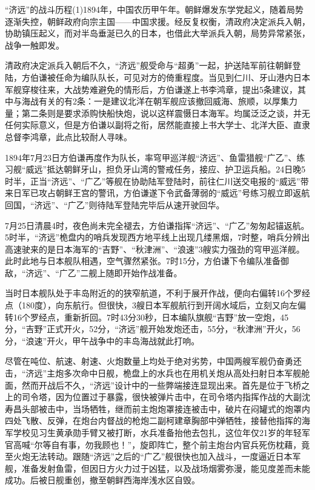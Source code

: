 \documentclass[12pt,UTF8]{ctexbook}
\begin{document}
“济远”的战斗历程(1)1894年，中国农历甲午年。朝鲜爆发东学党起义，随着局势逐渐失控，朝鲜政府向宗主国——中国求援。经反复权衡，清政府决定派兵入朝，协助镇压起义，而对半岛垂涎已久的日本，也借此大举派兵入朝，局势异常紧张，战争一触即发。

清政府决定派兵入朝后不久，“济远”舰受命与“超勇”一起，护送陆军前往朝鲜登陆，方伯谦被任命为编队队长，可见对方的倚重程度。当见到仁川、牙山港内日本军舰穿梭往来，大战势难避免的情形后，方伯谦遂上书李鸿章，提出5条建议，其中与海战有关的有2条：一是建议北洋在朝军舰应该撤回威海、旅顺，以厚集力量；第二条则是要求添购快船快炮，说以这样震慑日本海军。均属泛泛之谈，并无任何实际意义，但是方伯谦以副将之衔，居然能直接上书大学士、北洋大臣、直隶总督李鸿章，此点比较耐人寻味。

1894年7月23日方伯谦再度作为队长，率穹甲巡洋舰“济远”、鱼雷猎舰“广乙”、练习舰“威远”抵达朝鲜牙山，担负牙山湾的警戒任务，接应、护卫运兵船。24日晚5时半，正当“济远”、“广乙”等舰在协助陆军登陆时，前往仁川送交电报的“威远”带来日军已攻占朝鲜王宫的警讯，方伯谦遂下令武备薄弱的“威远”号练习舰立即返航回国，“济远”、“广乙”则待陆军登陆完毕后从速开驶回华。

7月25日清晨4时，夜色尚未完全褪去，方伯谦指挥“济远”、“广乙”匆匆起锚返航。5时半，“济远”桅盘内的哨兵发现西方地平线上出现几缕黑烟，7时整，哨兵分辨出高速驶来的是日本海军的“吉野”、“秋津洲”、“浪速”3艘实力强劲的穹甲巡洋舰。此时此地与日本舰队相遇，空气骤然紧张。7时15分，方伯谦下令编队准备御敌，“济远”、“广乙”二舰上随即开始作战准备。

当时日本舰队处于丰岛附近的的狭窄航道，不利于展开作战，便向右偏转16个罗经点（180度），向东航行。但很快，3艘日本军舰航行到开阔水域后，立刻又向左偏转16个罗经点，重新折回。7时43分30秒，日本编队旗舰“吉野”放一空炮，45分，“吉野”正式开火，52分，“济远”舰开始发炮还击，55分，“秋津洲”开火，56分，“浪速”开火，甲午战争中的丰岛海战就此打响。

尽管在吨位、航速、射速、火炮数量上均处于绝对劣势，中国两艘军舰仍奋勇还击，“济远”主炮多次命中日舰，桅盘上的水兵也在用机关炮从高处扫射日本军舰舱面，然而开战后不久，“济远”设计中的一些弊端接连显现出来。首先是位于飞桥之上的司令塔，因为位置过于暴露，很快被弹片击中，在司令塔内指挥作战的大副沈寿昌头部被击中，当场牺牲，继而前主炮炮罩接连被击中，破片在闷罐式的炮罩内四处飞散、反弹，在炮台内督战的枪炮二副柯建章胸部中弹牺牲，接替他指挥的海军学校见习生黄承勋手臂又被打断，水兵准备抬他去包扎，这位年仅21岁的年轻军官高喊“尔等自有事，勿我顾也！”，旋即阵亡，整个前主炮台内官兵死伤枕藉，竟至火炮无法转动。跟随“济远”之后的“广乙”舰很快也加入战斗，一度逼近日本军舰，准备发射鱼雷，但因日方火力过于凶猛，以及战场烟雾弥漫，能见度差而未能成功。后被日舰重创，撤至朝鲜西海岸浅水区自毁。
\end{document}
